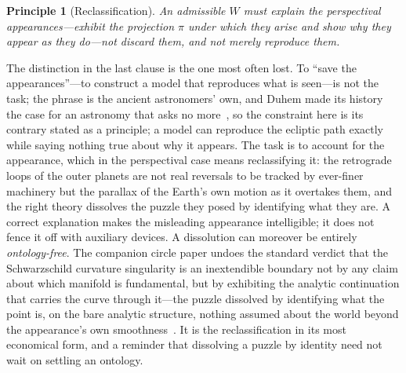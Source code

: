 \documentclass[11pt,a4paper]{article}
\newtheorem{principle}{Principle}
\begin{document}
\begin{principle}[Reclassification]\label{prin:reclass}
An admissible $W$ must \emph{explain} the perspectival appearances---exhibit the projection $\pi$ under which they arise and show why they appear as they do---not discard them, and not merely reproduce them.
\end{principle}

\noindent The distinction in the last clause is the one most often lost. To ``save the appearances''---to construct a model that reproduces what is seen---is not the task; the phrase is the ancient astronomers' own, and Duhem made its history the case for an astronomy that asks no more~\cite{Duhem1908}, so the constraint here is its contrary stated as a principle; a model can reproduce the ecliptic path exactly while saying nothing true about why it appears. The task is to account for the appearance, which in the perspectival case means reclassifying it: the retrograde loops of the outer planets are not real reversals to be tracked by ever-finer machinery but the parallax of the Earth's own motion as it overtakes them, and the right theory dissolves the puzzle they posed by identifying what they are. A correct explanation makes the misleading appearance intelligible; it does not fence it off with auxiliary devices. A dissolution can moreover be entirely \emph{ontology-free}. The companion circle paper undoes the standard verdict that the Schwarzschild curvature singularity is an inextendible boundary not by any claim about which manifold is fundamental, but by exhibiting the analytic continuation that carries the curve through it---the puzzle dissolved by identifying what the point is, on the bare analytic structure, nothing assumed about the world beyond the appearance's own smoothness~\cite{JanzenCircle}. It is the reclassification in its most economical form, and a reminder that dissolving a puzzle by identity need not wait on settling an ontology.
\end{document}
